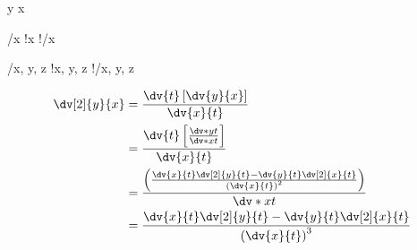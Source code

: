  \dv y x

 \quad {}





 \quad {}/{x} \quad {}!{x} \quad {}!/{x}


 \quad {}/{x, y, z} \quad {}!{x, y, z} \quad {}!/{x, y, z}

\begin{align}
\dv[2]{y}{x}&=\frac{\dv{t}\left[\dv{y}{x}\right]}{\dv{x}{t}} \\
            &=\frac{\dv{t}\left[\frac{\dv*{y}{t}}{\dv*{x}{t}}\right]}{\dv{x}{t}} \\
            &=\frac{\left(\frac{\dv{x}{t}\dv[2]{y}{t} - \dv{y}{t}\dv[2]{x}{t}}{\left(\dv{x}{t}\right)^2}\right)}{\dv*{x}{t}} \\
            &=\frac{\dv{x}{t}\dv[2]{y}{t} - \dv{y}{t}\dv[2]{x}{t}}{\left(\dv{x}{t}\right)^3}
\end{align}
